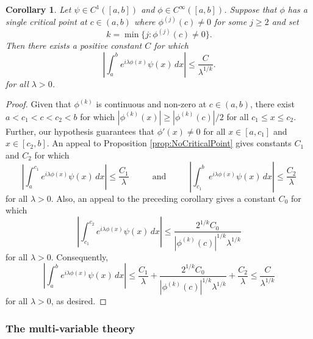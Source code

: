 \documentclass[11pt]{article}
\newtheorem{corollary}[theorem]{Corollary}
\begin{document}
\begin{corollary}\label{cor:minK}
Let $\psi\in C^1([a,b])$ and $\phi\in C^{\infty}([a,b])$. Suppose that $\phi$ has a single critical point at $c\in (a,b)$ where $\phi^{(j)}(c)\neq 0$ for some $j\geq 2$ and set
\begin{equation*}
    k=\min\{j:\phi^{(j)}(c)\neq 0\}.
\end{equation*}
Then there exists a positive constant $C$ for which
\begin{equation*}
    \left|\int_a^b e^{i\lambda\phi(x)}\psi(x)\,dx\right|\leq\frac{C}{\lambda^{1/k}}.
\end{equation*}
for all $\lambda>0$.
\end{corollary}
\begin{proof}
Given that $\phi^{(k)}$ is continuous and non-zero at $c\in (a,b)$, there exist $a<c_1<c<c_2<b$ for which $|\phi^{(k)}(x)|\geq |\phi^{(k)}(c)|/2$ for all $c_1\leq x\leq c_2$. Further, our hypothesis guarantees that $\phi'(x)\neq 0$ for all $x\in[a,c_1]$ and $x\in[c_2,b]$. An appeal to Proposition \ref{prop:NoCriticalPoint} gives constants $C_1$ and $C_2$ for which
\begin{equation*}
    \left|\int_a^{c_1}e^{i\lambda\phi(x)}\psi(x)\,dx\right|\leq \frac{C_1}{\lambda}\hspace{1cm}\mbox{ and }\hspace{1cm}\left|\int_{c_1}^b e^{i\lambda\phi(x)}\psi(x)\,dx\right|\leq \frac{C_2}{\lambda}
\end{equation*}
for all $\lambda>0$. Also, an appeal to the preceding corollary gives a constant $C_0$ for which
\begin{equation*}
    \left|\int_{c_1}^{c_2}e^{i\lambda\phi(x)}\psi(x)\,dx\right|\leq \frac{2^{1/k}C_0}{|\phi^{(k)}(c)|^{1/k}\lambda^{1/k}}
\end{equation*}
for all $\lambda>0$. Consequently,
\begin{equation*}
    \left|\int_a^b e^{i\lambda\phi(x)}\psi(x)\,dx\right|\leq \frac{C_1}{\lambda}+\frac{2^{1/k}C_0}{|\phi^{(k)}(c)|^{1/k}\lambda^{1/k}}+\frac{C_2}{\lambda}\leq \frac{C}{\lambda^{1/k}}
\end{equation*}
for all $\lambda>0$, as desired.
\end{proof}





\subsubsection{The multi-variable theory}
\end{document}
